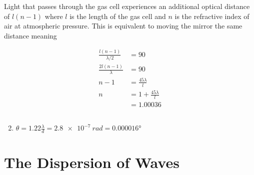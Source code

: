 \documentclass{article}
\begin{document}
Light that passes through the gas cell experiences an additional optical distance of $l (n - 1)$ where $l$ is the length of the gas cell and $n$ is the refractive index of air at atmospheric pressure. This is equivalent to moving the mirror the same distance meaning

\begin{align*}
  \frac{l (n - 1)}{\lambda / 2} & = 90                       \\
  \frac{2 l (n - 1)}{\lambda}   & = 90                       \\
  n - 1                         & = \frac{45 \lambda}{l}     \\
  n                             & = 1 + \frac{45 \lambda}{l} \\
                                & = 1.00036
\end{align*}

\setcounter{subsection}{9}
\subsection{}

\begin{enumerate}
  \setcounter{enumi}{1}
  \item $\theta = 1.22 \frac{\lambda}{d} = \qty{2.8e-7}{rad} = \ang{0.000016}$
\end{enumerate}

\section{The Dispersion of Waves}

\subsection{}
\end{document}
